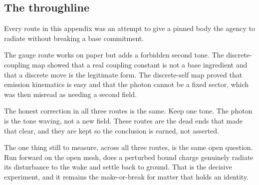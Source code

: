 \subsection{The throughline}

Every route in this appendix was an attempt to give a pinned body the agency to radiate without breaking a base commitment.

The gauge route works on paper but adds a forbidden second tone. The discrete-coupling map showed that a real coupling constant is not a base ingredient and that a discrete move is the legitimate form. The discrete-self map proved that emission kinematics is easy and that the photon cannot be a fixed sector, which was then misread as needing a second field.

\begin{result}
The honest correction in all three routes is the same. Keep one tone. The photon is the tone waving, not a new field. These routes are the dead ends that made that clear, and they are kept so the conclusion is earned, not asserted.
\end{result}

The one thing still to measure, across all three routes, is the same open question. Run forward on the open mesh, does a perturbed bound charge genuinely radiate its disturbance to the wake and settle back to ground. That is the decisive experiment, and it remains the make-or-break for matter that holds an identity.

